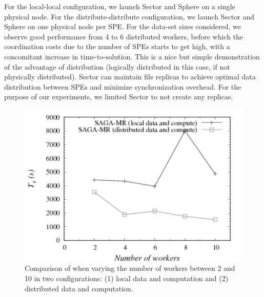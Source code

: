\documentclass[graybox]{svmult}
\begin{document}
For the
local-local configuration, we launch Sector and Sphere on a single
physical node.  For the distribute-distribute configuration, we launch
Sector and Sphere on one physical node per SPE.  For the data-set
sizes considered, we observe good performance from 4 to 6 distributed
workers, before which the coordination costs due to the number of SPEs
starts to get high, with a concomitant increase in
time-to-solution. This is a nice but simple demonstration of the
advantage of distribution (logically distributed in this case, if not
physically distributed). Sector can maintain file replicas to achieve
optimal data distribution between SPEs and minimize synchronization
overhead. For the purpose of our experiments, we limited Sector to not
create any replicas.

\begin{figure}[htb!]
 \dnnn\dnnn
 \includegraphics[width=1.0\textwidth]{figures/sagamr_varying_workers-gray.pdf}
 \caption{
   Comparison of \sagamapreduce when varying the number of workers
   between 2 and 10 in two configurations: (1) local data and computation
   and (2) distributed data and computation.
   \label{fig:sagamr_varying_workers}
   }
\end{figure}
\end{document}
